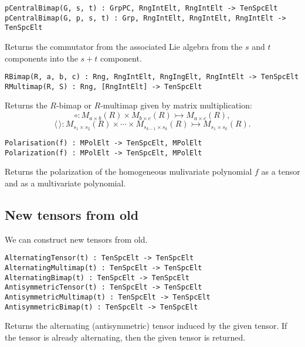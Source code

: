 \documentclass{amsart}
\begin{document}
\color{blue}
{\small \begin{verbatim}
pCentralBimap(G, s, t) : GrpPC, RngIntElt, RngIntElt -> TenSpcElt
pCentralBimap(G, p, s, t) : Grp, RngIntElt, RngIntElt, RngIntElt -> TenSpcElt
\end{verbatim} }
\color{black}

Returns the commutator from the associated Lie algebra from the $s$ and $t$
components into the $s+t$ component. 

\color{blue}
{\small \begin{verbatim}
RBimap(R, a, b, c) : Rng, RngIntElt, RngIngElt, RngIntElt -> TenSpcElt
RMultimap(R, S) : Rng, [RngIntElt] -> TenSpcElt
\end{verbatim} }
\color{black}

Returns the $R$-bimap or $R$-multimap given by matrix multiplication: 
\[ \circ: M_{a\times b}(R)\times M_{b\times c}(R)\rightarrowtail 
M_{a\times c}(R),\]
\[ \langle \,\rangle : M_{s_1\times s_2}(R) \times \cdots \times 
M_{s_{k-1}\times s_k}(R) \rightarrowtail M_{s_1\times s_k}(R).\]

\color{blue}
{\small \begin{verbatim}
Polarisation(f) : MPolElt -> TenSpcElt, MPolElt
Polarization(f) : MPolElt -> TenSpcElt, MPolElt
\end{verbatim} }
\color{black}

Returns the polarization of the homogeneous mulivariate polynomial $f$ as a
tensor and as a multivariate polynomial.

\subsection{New tensors from old}
We can construct new tensors from old.

\color{blue}
{\small \begin{verbatim}
AlternatingTensor(t) : TenSpcElt -> TenSpcElt
AlternatingMultimap(t) : TenSpcElt -> TenSpcElt
AlternatingBimap(t) : TenSpcElt -> TenSpcElt
AntisymmetricTensor(t) : TenSpcElt -> TenSpcElt
AntisymmetricMultimap(t) : TenSpcElt -> TenSpcElt
AntisymmetricBimap(t) : TenSpcElt -> TenSpcElt
\end{verbatim} }
\color{black}

Returns the alternating (antisymmetric) tensor induced by the given tensor. If 
the tensor is already alternating, then the given tensor is returned.
\end{document}
